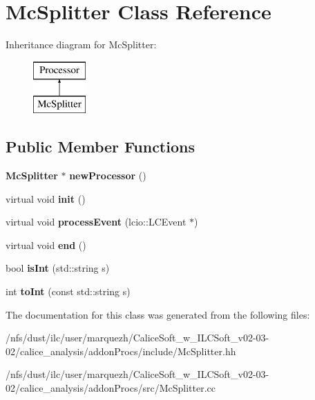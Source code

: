 \section{Mc\-Splitter Class Reference}
\label{classMcSplitter}
Inheritance diagram for Mc\-Splitter\-:\begin{figure}[H]
\begin{center}
\leavevmode
\includegraphics[height=2.000000cm]{classMcSplitter}
\end{center}
\end{figure}
\subsection*{Public Member Functions}
\begin{DoxyCompactItemize}
\item 
{\bf Mc\-Splitter} $\ast$ {\bfseries new\-Processor} ()\label{classMcSplitter_a712b72cabe110e8069c97895dcf73706}

\item 
virtual void {\bfseries init} ()\label{classMcSplitter_af9b90148faf589c6fb7e6a1c718d03f2}

\item 
virtual void {\bfseries process\-Event} (lcio\-::\-L\-C\-Event $\ast$)\label{classMcSplitter_a139fcffe97218a69776de8cb119222ac}

\item 
virtual void {\bfseries end} ()\label{classMcSplitter_a0f97174737126b2daeeab00626b6441f}

\item 
bool {\bfseries is\-Int} (std\-::string s)\label{classMcSplitter_af733254b12fe00cc43dc066b4abf3885}

\item 
int {\bfseries to\-Int} (const std\-::string s)\label{classMcSplitter_af432df32a9c3064ee0e3af878b55d301}

\end{DoxyCompactItemize}


The documentation for this class was generated from the following files\-:\begin{DoxyCompactItemize}
\item 
/nfs/dust/ilc/user/marquezh/\-Calice\-Soft\-\_\-w\-\_\-\-I\-L\-C\-Soft\-\_\-v02-\/03-\/02/calice\-\_\-analysis/addon\-Procs/include/Mc\-Splitter.\-hh\item 
/nfs/dust/ilc/user/marquezh/\-Calice\-Soft\-\_\-w\-\_\-\-I\-L\-C\-Soft\-\_\-v02-\/03-\/02/calice\-\_\-analysis/addon\-Procs/src/Mc\-Splitter.\-cc\end{DoxyCompactItemize}
